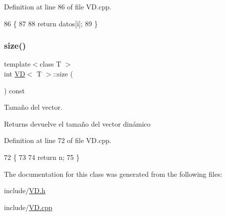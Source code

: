 Definition at line 86 of file V\+D.\+cpp.


\begin{DoxyCode}
86                                       \{
87 
88     \textcolor{keywordflow}{return} datos[i];
89 \}
\end{DoxyCode}
\mbox{\label{classVD_a411ad026db1c8e0617d9031f1f1017a5}} 
\subsubsection{\texorpdfstring{size()}{size()}}
{\footnotesize\ttfamily template$<$class T $>$ \\
int \hyperlink{classVD}{VD}$<$ T $>$\+::size (\begin{DoxyParamCaption}{ }\end{DoxyParamCaption}) const}



Tamaño del vector. 

\begin{DoxyReturn}{Returns}
devuelve el tamaño del vector dinámico 
\end{DoxyReturn}


Definition at line 72 of file V\+D.\+cpp.


\begin{DoxyCode}
72                      \{
73 
74     \textcolor{keywordflow}{return} n;
75 \}
\end{DoxyCode}


The documentation for this class was generated from the following files\+:\begin{DoxyCompactItemize}
\item 
include/\hyperlink{VD_8h}{V\+D.\+h}\item 
include/\hyperlink{VD_8cpp}{V\+D.\+cpp}\end{DoxyCompactItemize}
